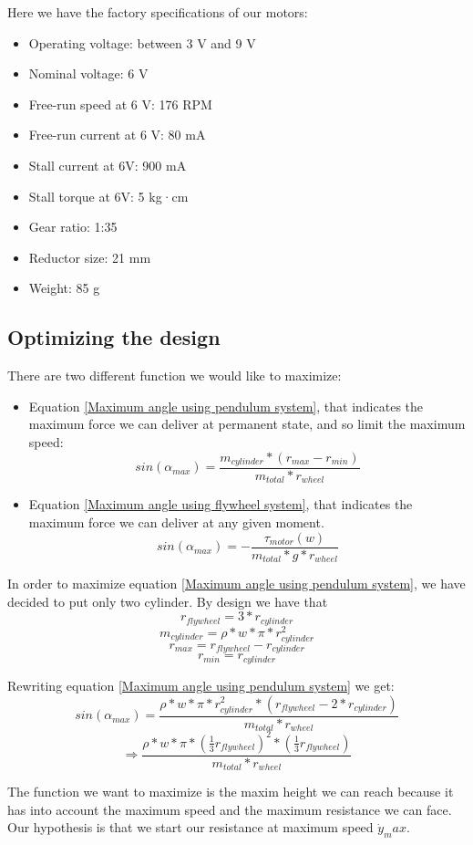 Here we have the factory specifications of our motors: 
\begin{itemize}
    \item Operating voltage: between 3 V and 9 V
    \item Nominal voltage: 6 V
    \item Free-run speed at 6 V: 176 RPM
    \item Free-run current at 6 V: 80 mA
    \item Stall current at 6V: 900 mA
    \item Stall torque at 6V: 5 kg·cm
    \item Gear ratio: 1:35
    \item Reductor size: 21 mm
    \item Weight: 85 g
\end{itemize}

\subsection{Optimizing the design}
There are two different function we would like to maximize:
\begin{itemize}
    \item Equation \ref{Maximum angle using pendulum system}, that indicates the maximum force we can deliver at permanent state, and so limit the maximum speed:
     \[sin(\alpha_{max}) = \frac{m_{cylinder} * (r_{max}- r_{min})}{m_{total} * r_{wheel}}\]
     \item Equation \ref{Maximum angle using flywheel system}, that indicates the maximum force we can deliver at any given moment.
     \[sin(\alpha_{max}) = - \frac{\tau_{motor} (w)}{m_{total} * g * r_{wheel}} \]
\end{itemize}

In order to maximize equation \ref{Maximum angle using pendulum system}, we have decided to put only two cylinder.
By design we have that
\[r_{flywheel} = 3 * r_{cylinder}\]
\[m_{cylinder} = \rho * w * \pi * r_{cylinder}^2 \]
\[r_{max} = r_{flywheel} - r_{cylinder}\]
\[r_{min} = r_{cylinder}\]

Rewriting equation \ref{Maximum angle using pendulum system} we get:
\[sin(\alpha_{max}) = \frac{\rho * w * \pi * r_{cylinder}^2 * (r_{flywheel} - 2 * r_{cylinder})}{m_{total} * r_{wheel}}\]
\[\Rightarrow \frac{\rho * w * \pi * (\frac{1}{3} r_{flywheel})^2 * (\frac{1}{3} r_{flywheel})}{m_{total} * r_{wheel}} \]

\iffalse
The function we want to maximize is the maxim height we can reach because it has into account the maximum speed and the maximum resistance we can face.
Our hypothesis is that we start our resistance at maximum speed $\dot{y}_max$.


